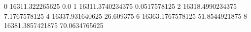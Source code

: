 0 16311.322265625 0.0
1 16311.3740234375 0.0517578125
2 16318.4990234375 7.1767578125
4 16337.931640625 26.609375
6 16363.1767578125 51.8544921875
8 16381.3857421875 70.0634765625
